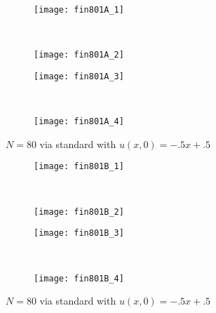 \documentclass[10pt,letterpaper,fleqn]{article}
\begin{document}
\begin{figure}[h!]
        \centering
        \begin{subfigure}[b]{0.4\textwidth}
                \texttt{[image: fin801A\_1]}
        \end{subfigure}%
        ~ 
        \begin{subfigure}[b]{0.4\textwidth}
                \texttt{[image: fin801A\_2]}
        \end{subfigure}
        
        \begin{subfigure}[b]{0.4\textwidth}
                \texttt{[image: fin801A\_3]}
        \end{subfigure}
        ~
        \begin{subfigure}[b]{0.4\textwidth}
                \texttt{[image: fin801A\_4]}
        \end{subfigure}
        \caption{$N = 80$ via standard with $u(x,0) = -.5x + .5$}
\end{figure}

\begin{figure}[h!]
        \centering
        \begin{subfigure}[b]{0.4\textwidth}
                \texttt{[image: fin801B\_1]}
        \end{subfigure}%
        ~ 
        \begin{subfigure}[b]{0.4\textwidth}
                \texttt{[image: fin801B\_2]}
        \end{subfigure}
        
        \begin{subfigure}[b]{0.4\textwidth}
                \texttt{[image: fin801B\_3]}
        \end{subfigure}
        ~
        \begin{subfigure}[b]{0.4\textwidth}
                \texttt{[image: fin801B\_4]}
        \end{subfigure}
        \caption{$N = 80$ via standard with $u(x,0) = -.5x + .5$}
\end{figure}
\end{document}
